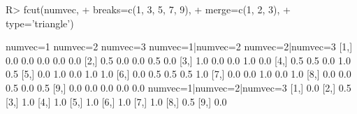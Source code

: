 \begin{Schunk}
% --begin: "fcut.merge2"
\begin{Sinput}
R> fcut(numvec,
+       breaks=c(1, 3, 5, 7, 9),
+       merge=c(1, 2, 3),
+       type='triangle')
\end{Sinput}
\begin{Soutput}
      numvec=1 numvec=2 numvec=3 numvec=1|numvec=2 numvec=2|numvec=3
 [1,]      0.0      0.0      0.0               0.0               0.0
 [2,]      0.5      0.0      0.0               0.5               0.0
 [3,]      1.0      0.0      0.0               1.0               0.0
 [4,]      0.5      0.5      0.0               1.0               0.5
 [5,]      0.0      1.0      0.0               1.0               1.0
 [6,]      0.0      0.5      0.5               0.5               1.0
 [7,]      0.0      0.0      1.0               0.0               1.0
 [8,]      0.0      0.0      0.5               0.0               0.5
 [9,]      0.0      0.0      0.0               0.0               0.0
      numvec=1|numvec=2|numvec=3
 [1,]                        0.0
 [2,]                        0.5
 [3,]                        1.0
 [4,]                        1.0
 [5,]                        1.0
 [6,]                        1.0
 [7,]                        1.0
 [8,]                        0.5
 [9,]                        0.0
\end{Soutput}
%
% --end: "fcut.merge2"
\end{Schunk}
